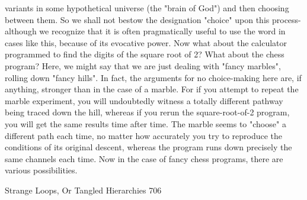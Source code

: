 variants in some hypothetical universe (the "brain of God") and then choosing between
them. So we shall not bestow the designation "choice" upon this process-although we
recognize that it is often pragmatically useful to use the word in cases like this, because
of its evocative power.
         Now what about the calculator programmed to find the digits of the square root of
2? What about the chess program? Here, we might say that we are just dealing with
"fancy marbles", rolling down "fancy hills". In fact, the arguments for no choice-making
here are, if anything, stronger than in the case of a marble. For if you attempt to repeat
the marble experiment, you will undoubtedly witness a totally different pathway being
traced down the hill, whereas if you rerun the square-root-of-2 program, you will get the
same results time after time. The marble seems to "choose" a different path each time, no
matter how accurately you try to reproduce the conditions of its original descent, whereas
the program runs down precisely the same channels each time.
         Now in the case of fancy chess programs, there are various possibilities.




Strange Loops, Or Tangled Hierarchies                                                  706


